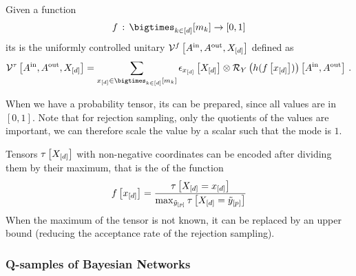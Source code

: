 \begin{definition}[\ActivationCircuit{}]
    Given a function
    \begin{align*}
        \exformula \wcols \facstates \rightarrow [0,1]
    \end{align*}
    its \activationCircuit{} is the uniformly controlled unitary
    $\mathcal{V}^{f}\left[A^{\mathrm{in}},A^{\mathrm{out}},X_{[d]}\right]$ defined as
    \begin{align*} %
        \qcaencodingofat{\hypercore}{\cavariable{\insymbol},\cavariable{\outsymbol},\shortcatvariables}
        = \sum_{\shortcatindicesin} \onehotmapofat{\shortcatindices}{\shortcatvariables}
        \otimes \yrotationofat{h(\exformulaat{\shortcatindices})}{\cavariable{\insymbol},\cavariable{\outsymbol}} \, .
    \end{align*}
\end{definition}


When we have a probability tensor, its \activationCircuit{} can be prepared, since all values are in $[0,1]$.
Note that for rejection sampling, only the quotients of the values are important, we can therefore scale the value by a scalar such that the mode is $1$.


Tensors $\tau\left[X_{[d]}\right]$ with non-negative coordinates can be encoded after dividing them by their maximum, that is the \activationCircuit{} of the function
\begin{align*}
    f\left[x_{[d]}\right]
    = \frac{\tau\left[X_{[d]}=x_{[d]}\right]}{\max_{\tilde{y}_{[p]}} \tau\left[X_{[d]}=\tilde{y}_{[p]}\right]}
\end{align*}
When the maximum of the tensor is not known, it can be replaced by an upper bound (reducing the acceptance rate of the rejection sampling).


\subsubsection{Q-samples of Bayesian Networks}

